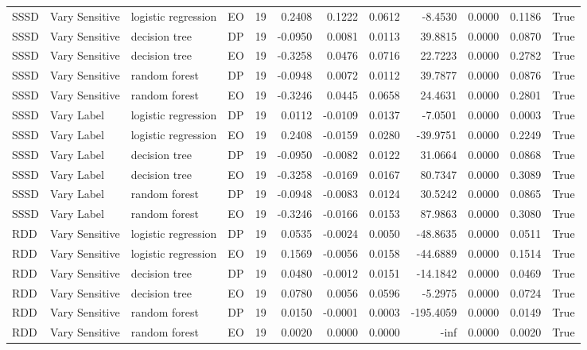 \begin{table}
\begin{tabular}{llllrrrrrrrr}
SSSD & Vary Sensitive & logistic regression & EO & 19 & 0.2408 & 0.1222 & 0.0612 & -8.4530 & 0.0000 & 0.1186 & True \\
SSSD & Vary Sensitive & decision tree & DP & 19 & -0.0950 & 0.0081 & 0.0113 & 39.8815 & 0.0000 & 0.0870 & True \\
SSSD & Vary Sensitive & decision tree & EO & 19 & -0.3258 & 0.0476 & 0.0716 & 22.7223 & 0.0000 & 0.2782 & True \\
SSSD & Vary Sensitive & random forest & DP & 19 & -0.0948 & 0.0072 & 0.0112 & 39.7877 & 0.0000 & 0.0876 & True \\
SSSD & Vary Sensitive & random forest & EO & 19 & -0.3246 & 0.0445 & 0.0658 & 24.4631 & 0.0000 & 0.2801 & True \\
SSSD & Vary Label & logistic regression & DP & 19 & 0.0112 & -0.0109 & 0.0137 & -7.0501 & 0.0000 & 0.0003 & True \\
SSSD & Vary Label & logistic regression & EO & 19 & 0.2408 & -0.0159 & 0.0280 & -39.9751 & 0.0000 & 0.2249 & True \\
SSSD & Vary Label & decision tree & DP & 19 & -0.0950 & -0.0082 & 0.0122 & 31.0664 & 0.0000 & 0.0868 & True \\
SSSD & Vary Label & decision tree & EO & 19 & -0.3258 & -0.0169 & 0.0167 & 80.7347 & 0.0000 & 0.3089 & True \\
SSSD & Vary Label & random forest & DP & 19 & -0.0948 & -0.0083 & 0.0124 & 30.5242 & 0.0000 & 0.0865 & True \\
SSSD & Vary Label & random forest & EO & 19 & -0.3246 & -0.0166 & 0.0153 & 87.9863 & 0.0000 & 0.3080 & True \\
RDD & Vary Sensitive & logistic regression & DP & 19 & 0.0535 & -0.0024 & 0.0050 & -48.8635 & 0.0000 & 0.0511 & True \\
RDD & Vary Sensitive & logistic regression & EO & 19 & 0.1569 & -0.0056 & 0.0158 & -44.6889 & 0.0000 & 0.1514 & True \\
RDD & Vary Sensitive & decision tree & DP & 19 & 0.0480 & -0.0012 & 0.0151 & -14.1842 & 0.0000 & 0.0469 & True \\
RDD & Vary Sensitive & decision tree & EO & 19 & 0.0780 & 0.0056 & 0.0596 & -5.2975 & 0.0000 & 0.0724 & True \\
RDD & Vary Sensitive & random forest & DP & 19 & 0.0150 & -0.0001 & 0.0003 & -195.4059 & 0.0000 & 0.0149 & True \\
RDD & Vary Sensitive & random forest & EO & 19 & 0.0020 & 0.0000 & 0.0000 & -inf & 0.0000 & 0.0020 & True \\

\end{tabular}
\end{table}
